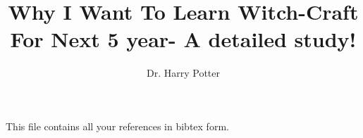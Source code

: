 \documentclass[10pt,a4paper]{book}
\title{Why I Want To Learn Witch-Craft For Next 5 year- A detailed study!}
\author{Dr. Harry Potter}								%
\begin{document}
	\frontmatter 
	\pagestyle{empty}
	
	\maketitle
	\makecertificate{}
	\tableofcontents
	\listoffigures
	\listoftables
	
	
	\mainmatter 
	\pagestyle{fancy} 
	
	
	\appendix
	
	This file contains all your references in bibtex form.
						
	
\end{document}
